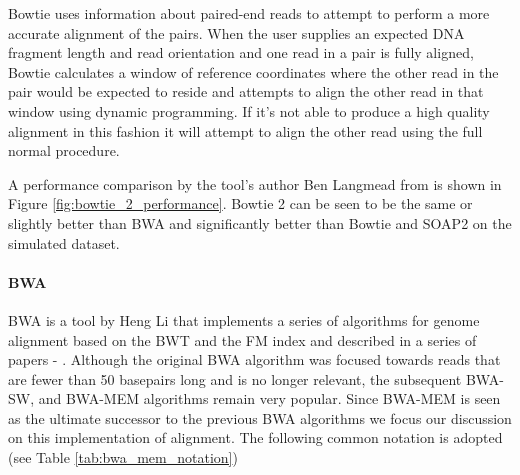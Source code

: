 Bowtie uses information about paired-end reads to attempt to perform a more accurate alignment of the pairs. When the user supplies an expected DNA fragment length and read orientation and one read in a pair is fully aligned, Bowtie calculates a window of reference coordinates where the other read in the pair would be expected to reside and attempts to align the other read in that window using dynamic programming. If it's not able to produce a high quality alignment in this fashion it will attempt to align the other read using the full normal procedure. 

A performance comparison by the tool's author Ben Langmead from \autocite{langmead2012fast} is shown in Figure \ref{fig:bowtie_2_performance}. Bowtie 2 can be seen to be the same or slightly better than BWA and significantly better than Bowtie and SOAP2 on the simulated dataset.

\paragraph{BWA}

BWA is a tool by Heng Li that implements a series of algorithms for genome alignment based on the BWT and the FM index and described in a series of papers - \autocites{li2010fast}{li2009fast}{li2013aligning}. Although the original BWA algorithm was focused towards reads that are fewer than 50 basepairs long and is no longer relevant, the subsequent BWA-SW, and BWA-MEM algorithms remain very popular. Since BWA-MEM is seen as the ultimate successor to the previous BWA algorithms we focus our discussion on this implementation of alignment. The following common notation is adopted (see Table \ref{tab:bwa_mem_notation})

